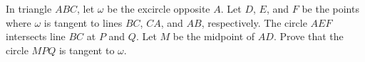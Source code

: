 In triangle $ABC$, let $\omega$ be the excircle opposite $A$. Let $D$, $E$, and $F$ be the points where $\omega$ is tangent to lines $BC$, $CA$, and $AB$, respectively. The circle $AEF$ intersects line $BC$ at $P$ and $Q$. Let $M$ be the midpoint of $AD$. Prove that the circle $MPQ$ is tangent to $\omega$.
